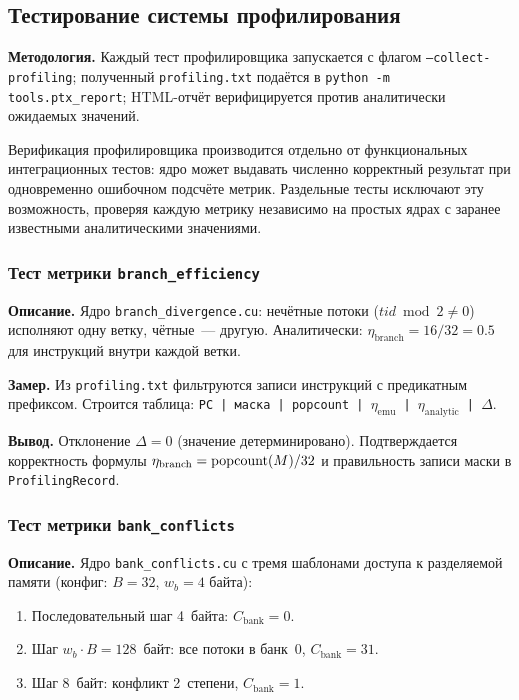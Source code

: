 \subsection{Тестирование системы профилирования}

\textbf{Методология.} Каждый тест профилировщика запускается с флагом
\texttt{--collect-profiling}; полученный \texttt{profiling.txt}
подаётся в \texttt{python -m tools.ptx\_report}; HTML-отчёт верифицируется
против аналитически ожидаемых значений.

Верификация профилировщика производится отдельно от функциональных
интеграционных тестов: ядро может выдавать численно корректный результат
при одновременно ошибочном подсчёте метрик. Раздельные тесты
исключают эту возможность, проверяя каждую метрику независимо
на простых ядрах с заранее известными аналитическими значениями.

\subsubsection{Тест метрики \texttt{branch\_efficiency}}

\textbf{Описание.}
Ядро \texttt{branch\_divergence.cu}: нечётные потоки
($\mathit{tid} \bmod 2 \neq 0$) исполняют одну ветку, чётные~--- другую.
Аналитически: $\eta_{\mathrm{branch}} = 16/32 = 0.5$ для инструкций
внутри каждой ветки.

\textbf{Замер.}
Из \texttt{profiling.txt} фильтруются записи инструкций с предикатным
префиксом. Строится таблица:
\texttt{PC | маска | popcount | $\eta_{\mathrm{emu}}$ | $\eta_{\mathrm{analytic}}$ | $\Delta$}.

\textbf{Вывод.}
Отклонение $\Delta = 0$ (значение детерминировано). Подтверждается
корректность формулы $\eta_{\mathrm{branch}} = \mathrm{popcount}(M)/32$ и
правильность записи маски в \texttt{ProfilingRecord}.

\subsubsection{Тест метрики \texttt{bank\_conflicts}}

\textbf{Описание.}
Ядро \texttt{bank\_conflicts.cu} с тремя шаблонами доступа
к разделяемой памяти (конфиг: $B = 32$, $w_b = 4$ байта):
\begin{enumerate}
  \item Последовательный шаг 4~байта: $C_{\mathrm{bank}} = 0$.
  \item Шаг $w_b \cdot B = 128$~байт: все потоки в банк~0,
        $C_{\mathrm{bank}} = 31$.
  \item Шаг 8~байт: конфликт 2~степени, $C_{\mathrm{bank}} = 1$.
\end{enumerate}

